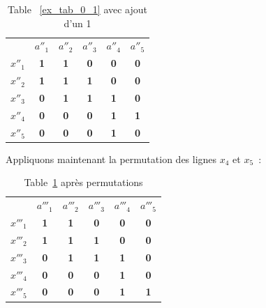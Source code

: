 \documentclass[a4paper]{report}
\renewcommand{\textbf}[1]{\begingroup\bfseries\mathversion{bold}#1\endgroup}
\begin{document}
\begin{table}[htb]
  \centering

\begin{tabular}{lccccc}
 & $a''_1$ & $a''_2$ & $a''_3$ & $a''_4$ & $a''_5$\\
$x''_1$ & \textbf{1} & \textbf{1} & \textbf{0} & \textbf{0} & \textbf{0}\\
$x''_2$ & \textbf{1} & \textbf{1} & \textbf{1} & \textbf{0} & \textbf{0}\\
$x''_3$ & \textbf{0} & \textbf{1} & \textbf{1} & \textbf{1} & \textbf{0}\\
$x''_4$ & \textbf{0} & \textbf{0} & \textbf{0} & \textbf{1} & \textbf{1}\\
$x''_5$ & \textbf{0} & \textbf{0} & \textbf{0} & \textbf{1} & \textbf{0}
\end{tabular}

\caption{Table ~\ref{ex_tab_0_1} avec ajout d'un 1}

\label{12ex_tab_0_1}

\end{table}


Appliquons maintenant la permutation des lignes $x_4$ et $x_5$~:

\begin{table}[htb]
  \centering

\begin{tabular}{lccccc}
 & $a'''_1$ & $a'''_2$ & $a'''_3$ & $a'''_4$ & $a'''_5$\\
$x'''_1$ & \textbf{1} & \textbf{1} & \textbf{0} & \textbf{0} & \textbf{0}\\
$x'''_2$ & \textbf{1} & \textbf{1} & \textbf{1} & \textbf{0} & \textbf{0}\\
$x'''_3$ & \textbf{0} & \textbf{1} & \textbf{1} & \textbf{1} & \textbf{0}\\
$x'''_4$ & \textbf{0} & \textbf{0} & \textbf{0} & \textbf{1} & \textbf{0}\\
$x'''_5$ & \textbf{0} & \textbf{0} & \textbf{0} & \textbf{1} & \textbf{1}

\end{tabular}

\caption{Table~\ref{12ex_tab_0_1} après permutations}

\label{3ex_tab_0_1_dem}

\end{table}
\end{document}
